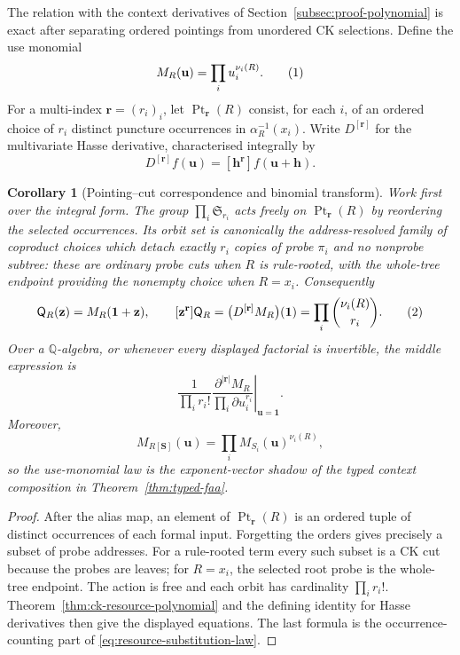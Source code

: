 \documentclass[10pt,a4paper]{article}
\theoremstyle{plain}
\newtheorem{corollary}[theorem]{Corollary}
\theoremstyle{definition}
\theoremstyle{remark}
\newcommand{\eqtag}{\refstepcounter{equation}\tag{\theequation}}
\begin{document}
The relation with the context derivatives of
Section~\ref{subsec:proof-polynomial} is exact after separating ordered
pointings from unordered CK selections.  Define the use monomial
\[
                  M_R(\mathbf u)=\prod_i u_i^{\nu_i(R)}.
\eqtag\label{eq:use-monomial}
\]
For a multi-index \(\mathbf r=(r_i)_i\), let
\(\operatorname{Pt}_{\mathbf r}(R)\) consist, for each \(i\), of an
ordered choice of \(r_i\) distinct puncture occurrences in
\(\alpha_R^{-1}(x_i)\).  Write \(D^{[\mathbf r]}\) for the multivariate
Hasse derivative, characterised integrally by
\[
 D^{[\mathbf r]}f(\mathbf u)
   =[\mathbf h^{\mathbf r}]f(\mathbf u+\mathbf h).
\]

\begin{corollary}[Pointing--cut correspondence and binomial transform]
\label{cor:pointing-cut-correspondence}
Work first over the integral form.
The group \(\prod_i\mathfrak S_{r_i}\) acts freely on
\(\operatorname{Pt}_{\mathbf r}(R)\) by reordering the selected
occurrences.  Its orbit set is canonically the address-resolved family of
coproduct choices which detach exactly \(r_i\) copies of probe \(\pi_i\)
and no nonprobe subtree: these are ordinary probe cuts when \(R\) is
rule-rooted, with the whole-tree endpoint providing the nonempty choice
when \(R=x_i\).  Consequently
\[
 \mathsf Q_R(\mathbf z)=M_R(\mathbf 1+\mathbf z),
 \qquad
 [\mathbf z^{\mathbf r}]\mathsf Q_R
   =\bigl(D^{[\mathbf r]}M_R\bigr)(\mathbf 1)
   =\prod_i\binom{\nu_i(R)}{r_i}.
\eqtag\label{eq:resource-hasse-derivative}
\]
Over a \(\mathbb Q\)-algebra, or whenever every displayed factorial is
invertible, the middle expression is
\[
 \left.
 \frac{1}{\prod_i r_i!}
 \frac{\partial^{|\mathbf r|}M_R}
      {\prod_i\partial u_i^{r_i}}
 \right|_{\mathbf u=\mathbf 1}.
\]
Moreover,
\[
 M_{R[\mathbf S]}(\mathbf u)
    =\prod_i M_{S_i}(\mathbf u)^{\nu_i(R)},
\]
so the use-monomial law is the exponent-vector shadow of the typed context
composition in Theorem~\ref{thm:typed-faa}.
\end{corollary}

\begin{proof}
After the alias map, an element of
\(\operatorname{Pt}_{\mathbf r}(R)\) is an ordered tuple of distinct
occurrences of each formal input.  Forgetting the orders gives precisely a
subset of probe addresses.  For a rule-rooted term every such subset is a CK cut because
the probes are leaves; for \(R=x_i\), the selected root probe is the
whole-tree endpoint.  The action is free and each orbit has cardinality
\(\prod_i r_i!\).  Theorem~\ref{thm:ck-resource-polynomial} and the defining
identity for Hasse derivatives then give the displayed equations.  The
last formula is the occurrence-counting part of
\eqref{eq:resource-substitution-law}.
\end{proof}
\end{document}
